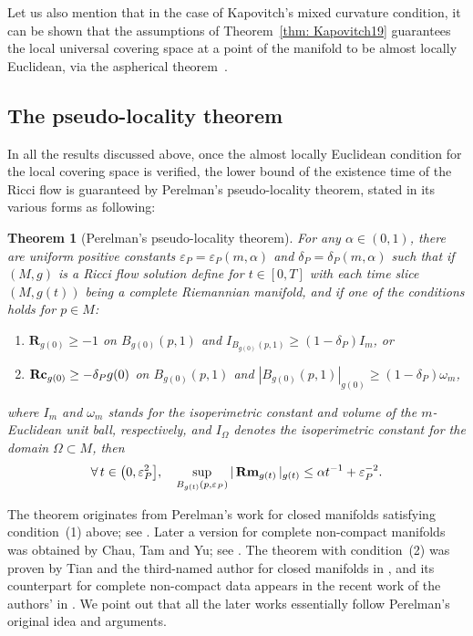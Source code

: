 \documentclass[pdftex]{sigma}
\numberwithin{equation}{section}
\newtheorem{Theorem}{Theorem}[section]
\newcommand{\Rm}{\operatorname{\bf Rm}}
\newcommand{\Rc}{\operatorname{\bf Rc}}
\newcommand{\Sc}{\mathbf{R}}
\begin{document}
Let us also mention that in the case of Kapovitch's mixed curvature condition,
it can be shown that the assumptions of Theorem~\ref{thm: Kapovitch19}
guarantees the local universal covering space at a point of the manifold to be
 almost locally Euclidean, via the aspherical theorem~\cite[Theorem~5.3]{Kapovitch19}.

\subsection{The pseudo-locality theorem}\label{section4.2}
In all the results discussed above, once the almost locally Euclidean condition
for the local covering space is verified, the lower bound of the existence time
of the Ricci flow is guaranteed by Perelman's pseudo-locality theorem, stated
in its various forms as following:
\begin{Theorem}[Perelman's pseudo-locality theorem]
For any $\alpha\in (0,1)$, there are uniform positive constants
$\varepsilon_P=\varepsilon_P(m,\alpha)$ and $\delta_P=\delta_P(m,\alpha)$
such that if $(M,g)$ is a Ricci flow solution define for $t\in [0,T]$ with each
time slice $(M,g(t))$ being a complete Riemannian manifold, and if one of the
conditions holds for $p\in M$:
\begin{enumerate}\itemsep=0pt
 \item[$1)$] $\Sc_{g(0)}\ge -1$ on $B_{g(0)}(p,1)$ and $I_{B_{g(0)}(p,1)}\ge
 (1-\delta_P)I_m$, or
 \item[$2)$] $\Rc_{g(0)}\ge -\delta_P g(0)$ on $B_{g(0)}(p,1)$ and
 $|B_{g(0)}(p,1)|_{g(0)}\ge (1-\delta_P)\omega_m$,
\end{enumerate}
where $I_m$ and $\omega_m$ stands for the isoperimetric constant and volume of
the $m$-Euclidean unit ball, respectively, and $I_{\Omega}$ denotes the
isoperimetric constant for the domain $\Omega\subset M$, then
\begin{align}\label{eqn: pseudolocality_Rm}
\forall\, t\in \big(0,\varepsilon_P^2\big],\quad
\sup_{B_{g(t)}(p,\varepsilon_P)} |\Rm_{g(t)} |_{g(t)} \le \alpha
t^{-1} +\varepsilon_P^{-2}.
\end{align}
\end{Theorem}
The theorem originates from Perelman's work for closed manifolds satisfying
condition~(1) above; see \cite[Theorem 10.1]{Perelman}. Later a version for
complete non-compact manifolds was obtained by Chau, Tam and Yu; see
\cite[Theorem~8.1]{CTY11}. The theorem with condition~(2) was proven by Tian
and the third-named author for closed manifolds in \cite[Proposition~3.1]{TW15}, and its counterpart for complete non-compact data appears in
the recent work of the authors' in \cite[Proposition~6.1]{HW20a}. We point out
that all the later works essentially follow Perelman's original idea and
arguments.
\end{document}
